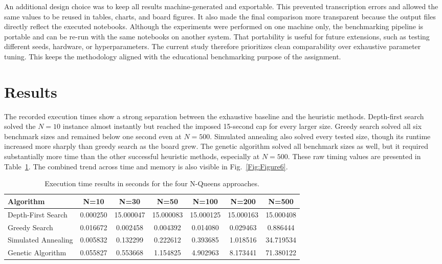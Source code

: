 \documentclass[conference]{IEEEtran}
\begin{document}
An additional design choice was to keep all results machine-generated and exportable. This prevented transcription errors and allowed the same values to be reused in tables, charts, and board figures. It also made the final comparison more transparent because the output files directly reflect the executed notebooks. Although the experiments were performed on one machine only, the benchmarking pipeline is portable and can be re-run with the same notebooks on another system. That portability is useful for future extensions, such as testing different seeds, hardware, or hyperparameters. The current study therefore prioritizes clean comparability over exhaustive parameter tuning. This keeps the methodology aligned with the educational benchmarking purpose of the assignment.

\section{Results}
The recorded execution times show a strong separation between the exhaustive baseline and the heuristic methods. Depth-first search solved the $N=10$ instance almost instantly but reached the imposed 15-second cap for every larger size. Greedy search solved all six benchmark sizes and remained below one second even at $N=500$. Simulated annealing also solved every tested size, though its runtime increased more sharply than greedy search as the board grew. The genetic algorithm solved all benchmark sizes as well, but it required substantially more time than the other successful heuristic methods, especially at $N=500$. These raw timing values are presented in Table~\ref{tab:time_results}. The combined trend across time and memory is also visible in Fig.~\ref{Fig:Figure6}.

\begin{table}[!ht]
\centering
\caption{Execution time results in seconds for the four N-Queens approaches.}
\label{tab:time_results}
\begin{tabular}{|l|c|c|c|c|c|c|}
\hline
\textbf{Algorithm} & \textbf{N=10} & \textbf{N=30} & \textbf{N=50} & \textbf{N=100} & \textbf{N=200} & \textbf{N=500} \\ \hline
Depth-First Search & 0.000250 & 15.000047 & 15.000083 & 15.000125 & 15.000163 & 15.000408 \\ \hline
Greedy Search & 0.016672 & 0.002458 & 0.004392 & 0.014080 & 0.029463 & 0.886444 \\ \hline
Simulated Annealing & 0.005832 & 0.132299 & 0.222612 & 0.393685 & 1.018516 & 34.719534 \\ \hline
Genetic Algorithm & 0.055827 & 0.553668 & 1.154825 & 4.902963 & 8.173441 & 71.380122 \\ \hline
\end{tabular}
\end{table}
\end{document}
